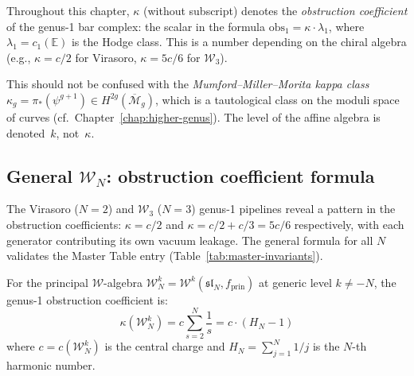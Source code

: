 \begin{remark}\label{rem:kappa-convention-disambiguation}
Throughout this chapter, $\kappa$ (without subscript) denotes the \emph{obstruction coefficient} of the genus-1 bar complex: the scalar in the formula $\mathrm{obs}_1 = \kappa \cdot \lambda_1$, where $\lambda_1 = c_1(\mathbb{E})$ is the Hodge class.  This is a number depending on the chiral algebra (e.g., $\kappa = c/2$ for Virasoro, $\kappa = 5c/6$ for $\mathcal{W}_3$).

This should not be confused with the \emph{Mumford--Miller--Morita kappa class} $\kappa_g = \pi_*(\psi^{g+1}) \in H^{2g}(\overline{\mathcal{M}}_g)$, which is a tautological class on the moduli space of curves (cf.\ Chapter~\ref{chap:higher-genus}).  The level of the affine algebra is denoted~$k$, not~$\kappa$.
\end{remark}

\subsection{\texorpdfstring{General $\mathcal{W}_N$: obstruction coefficient formula}{General WN: obstruction coefficient formula}}
\label{sec:wn-obstruction}

The Virasoro ($N = 2$) and $\mathcal{W}_3$ ($N = 3$) genus-1 pipelines
reveal a pattern in the obstruction coefficients: $\kappa = c/2$ and
$\kappa = c/2 + c/3 = 5c/6$ respectively, with each generator
contributing its own vacuum leakage.  The general formula
for all $N$ validates the Master Table entry
(Table~\ref{tab:master-invariants}).

\begin{theorem}
\label{thm:wn-obstruction}
For the principal $\mathcal{W}$-algebra
$\mathcal{W}_N^k = \mathcal{W}^k(\mathfrak{sl}_N, f_{\mathrm{prin}})$
at generic level $k \neq -N$, the genus-1 obstruction coefficient is:
\begin{equation}\label{eq:wn-kappa}
\kappa(\mathcal{W}_N^k) = c \sum_{s=2}^{N} \frac{1}{s}
= c \cdot (H_N - 1)
\end{equation}
where $c = c(\mathcal{W}_N^k)$ is the central charge and
$H_N = \sum_{j=1}^N 1/j$ is the $N$-th harmonic number.
\end{theorem}

